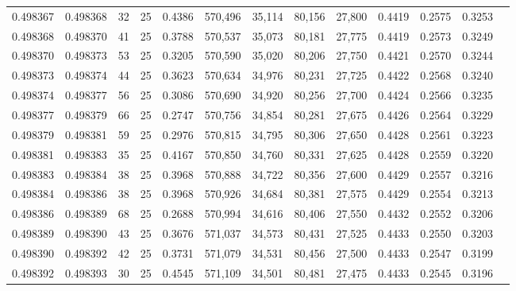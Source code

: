 \begin{tabular}{rrrrrrrrrrrrr}
0.498367 & 0.498368 &    32 &  25 &                                     0.4386 & 570,496 &  35,114 &  80,156 &  27,800 & 0.4419 & 0.2575 & 0.3253 \\
0.498368 & 0.498370 &    41 &  25 &                                     0.3788 & 570,537 &  35,073 &  80,181 &  27,775 & 0.4419 & 0.2573 & 0.3249 \\
0.498370 & 0.498373 &    53 &  25 &                                     0.3205 & 570,590 &  35,020 &  80,206 &  27,750 & 0.4421 & 0.2570 & 0.3244 \\
0.498373 & 0.498374 &    44 &  25 &                                     0.3623 & 570,634 &  34,976 &  80,231 &  27,725 & 0.4422 & 0.2568 & 0.3240 \\
0.498374 & 0.498377 &    56 &  25 &                                     0.3086 & 570,690 &  34,920 &  80,256 &  27,700 & 0.4424 & 0.2566 & 0.3235 \\
0.498377 & 0.498379 &    66 &  25 &                                     0.2747 & 570,756 &  34,854 &  80,281 &  27,675 & 0.4426 & 0.2564 & 0.3229 \\
0.498379 & 0.498381 &    59 &  25 &                                     0.2976 & 570,815 &  34,795 &  80,306 &  27,650 & 0.4428 & 0.2561 & 0.3223 \\
0.498381 & 0.498383 &    35 &  25 &                                     0.4167 & 570,850 &  34,760 &  80,331 &  27,625 & 0.4428 & 0.2559 & 0.3220 \\
0.498383 & 0.498384 &    38 &  25 &                                     0.3968 & 570,888 &  34,722 &  80,356 &  27,600 & 0.4429 & 0.2557 & 0.3216 \\
0.498384 & 0.498386 &    38 &  25 &                                     0.3968 & 570,926 &  34,684 &  80,381 &  27,575 & 0.4429 & 0.2554 & 0.3213 \\
0.498386 & 0.498389 &    68 &  25 &                                     0.2688 & 570,994 &  34,616 &  80,406 &  27,550 & 0.4432 & 0.2552 & 0.3206 \\
0.498389 & 0.498390 &    43 &  25 &                                     0.3676 & 571,037 &  34,573 &  80,431 &  27,525 & 0.4433 & 0.2550 & 0.3203 \\
0.498390 & 0.498392 &    42 &  25 &                                     0.3731 & 571,079 &  34,531 &  80,456 &  27,500 & 0.4433 & 0.2547 & 0.3199 \\
0.498392 & 0.498393 &    30 &  25 &                                     0.4545 & 571,109 &  34,501 &  80,481 &  27,475 & 0.4433 & 0.2545 & 0.3196 \\

\end{tabular}
